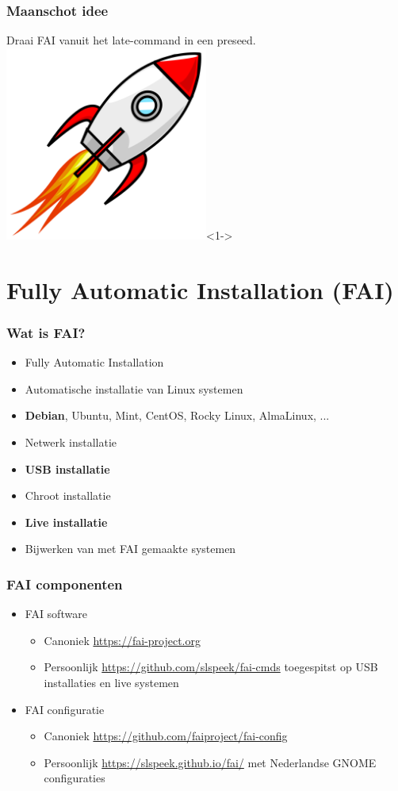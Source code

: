 \documentclass{beamer}
\begin{document}
\begin{frame}
\frametitle{Maanschot idee}
Draai FAI vanuit het late-command in een preseed.
\centering
\includegraphics[width=0.5\textwidth]{img/Cartoon_space_rocket.png}<1->
\end{frame}

\section{Fully Automatic Installation (FAI)}


\begin{frame}
\frametitle{Wat is FAI?}
\begin{itemize}
  \item Fully Automatic Installation
  \item Automatische installatie van Linux systemen
  \item \textbf{Debian}, Ubuntu, Mint, CentOS, Rocky Linux, AlmaLinux, ...
  \item Netwerk installatie
  \item \textbf{USB installatie}
  \item Chroot installatie
  \item \textbf{Live installatie}
  \item Bijwerken van met FAI gemaakte systemen
\end{itemize}
\end{frame}

\begin{frame}
\frametitle{FAI componenten}
\begin{itemize}
  \item FAI software
  \begin{itemize}
    \item Canoniek \url{https://fai-project.org}
    \item Persoonlijk \url{https://github.com/slspeek/fai-cmds} toegespitst op USB
     installaties en live systemen
  \end{itemize}
  \item FAI configuratie
  \begin{itemize}
    \item Canoniek \url{https://github.com/faiproject/fai-config}
    \item Persoonlijk \url{https://slspeek.github.io/fai/} met Nederlandse GNOME configuraties
  \end{itemize}
\end{itemize}
\end{frame}
\end{document}
